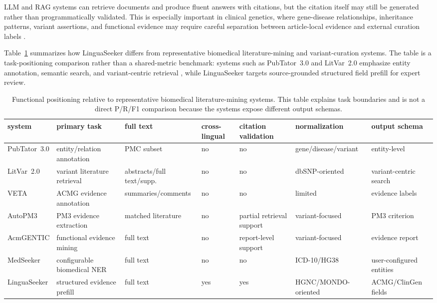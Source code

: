 \documentclass[conference]{IEEEtran}
\newcommand{\methodname}{LinguaSeeker}
\begin{document}
LLM and RAG systems can retrieve documents and produce fluent answers with citations, but the citation itself may still be generated rather than programmatically validated. This is especially important in clinical genetics, where gene-disease relationships, inheritance patterns, variant assertions, and functional evidence may require careful separation between article-local evidence and external curation labels \cite{pandit2025medhallu,onweller2026cited,queen2025cgbench,mortezaagha2026schemaconstrained,birgmeier2020avada,richards2015acmg,riggs2020cnv,brnich2020ps3bs3,tavtigian2018bayesian,aboutayoun2018pvs1}.

Table~\ref{tab:positioning} summarizes how \methodname{} differs from representative biomedical literature-mining and variant-curation systems. The table is a task-positioning comparison rather than a shared-metric benchmark: systems such as PubTator~3.0 and LitVar~2.0 emphasize entity annotation, semantic search, and variant-centric retrieval \cite{wei2024pubtator3,allot2023litvar2}, while \methodname{} targets source-grounded structured field prefill for expert review.

\begin{table}[t]
\centering
\caption{Functional positioning relative to representative biomedical literature-mining systems. This table explains task boundaries and is not a direct P/R/F1 comparison because the systems expose different output schemas.}
\label{tab:positioning}
\setlength{\tabcolsep}{3.5pt}
\renewcommand{\arraystretch}{1.08}
\footnotesize
\begin{tabular}{lllllll}
\toprule
system & primary task & full text & cross-lingual & citation validation & normalization & output schema \\
\midrule
PubTator~3.0 & entity/relation annotation & PMC subset & no & no & gene/disease/variant & entity-level \\
LitVar~2.0 & variant literature retrieval & abstracts/full text/supp. & no & no & dbSNP-oriented & variant-centric search \\
VETA & ACMG evidence annotation & summaries/comments & no & no & limited & evidence labels \\
AutoPM3 & PM3 evidence extraction & matched literature & no & partial retrieval support & variant-focused & PM3 criterion \\
AcmGENTIC & functional evidence mining & full text & no & report-level support & variant-focused & evidence report \\
MedSeeker & configurable biomedical NER & full text & no & no & ICD-10/HG38 & user-configured entities \\
\methodname{} & structured evidence prefill & full text & yes & yes & HGNC/MONDO-oriented & ACMG/ClinGen fields \\
\bottomrule
\end{tabular}
\end{table}
\end{document}
